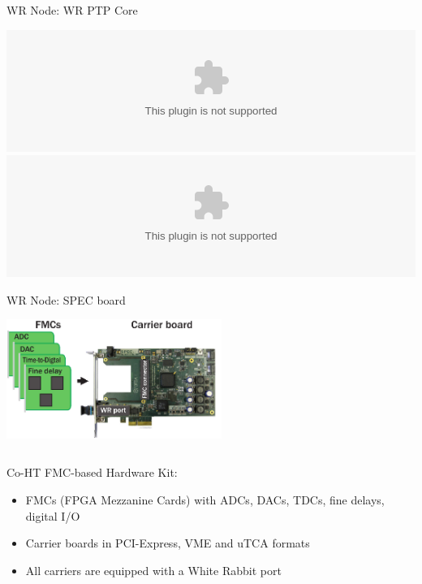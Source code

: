\documentclass[compress,red]{beamer}
\begin{document}
\begin{frame}{WR Node: WR PTP Core}

    \begin{center}
    \includegraphics<1>[width=1.0\textwidth]{node/wrpc_box.eps} \pause
    \includegraphics<2>[width=1.0\textwidth]{node/wrpc_inside.eps}
    \end{center}

\end{frame}
\begin{frame}{WR Node: SPEC board}

    \begin{center}
    \includegraphics[width=7cm]{node/shw_kit-1}
    \end{center}

  \begin{columns}[c]

	\begin{block}{Co-HT FMC-based Hardware Kit:}
	  \begin{itemize}
	  \item FMCs (FPGA Mezzanine Cards) with ADCs, DACs, TDCs, fine delays, digital I/O
	  \item Carrier boards in PCI-Express, VME and uTCA formats
	  \item All carriers are equipped with a White Rabbit port
	  \end{itemize}
	\end{block}

  \end{columns}


\end{frame}
\end{document}
